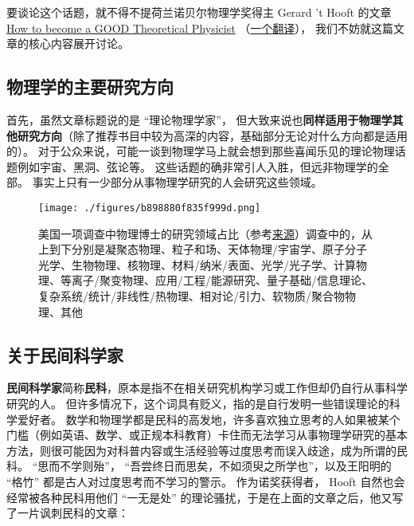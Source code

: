 
\begin{issues}
\issueDraft
\end{issues}

要谈论这个话题，就不得不提荷兰诺贝尔物理学奖得主 Gerard 't Hooft 的文章 \href{https://webspace.science.uu.nl/~hooft101/theorist.html}{How to become a GOOD Theoretical Physicist} （\href{https://xialab.pku.edu.cn/kytdyw1/zdylm.m.jsp?wbtreeid=1011&tstreeid=11956&_t_uid=2945&language=en&homepageuuid=BF649325C5584FC683CE0B601D21AC65&templateuuid=4CC182410BA14FF8B55ED726FB2087FB&producttype=0&_tmode_=99&tsitesapptype=zdylm}{一个翻译}）， 我们不妨就这篇文章的核心内容展开讨论。

\subsection{物理学的主要研究方向}
首先，虽然文章标题说的是 “理论物理学家”， 但大致来说也\textbf{同样适用于物理学其他研究方向}（除了推荐书目中较为高深的内容，基础部分无论对什么方向都是适用的）。 对于公众来说，可能一谈到物理学马上就会想到那些喜闻乐见的理论物理话题例如宇宙、黑洞、弦论等。 这些话题的确非常引人入胜，但远非物理学的全部。 事实上只有一少部分从事物理学研究的人会研究这些领域。

\begin{figure}[ht]
\centering
\texttt{[image: ./figures/b898880f835f999d.png]}
\caption{美国一项调查中物理博士的研究领域占比（参考\href{https://ww2.aip.org/statistics/trends-in-physics-phds}{来源}）调查中的，从上到下分别是凝聚态物理、粒子和场、天体物理/宇宙学、原子分子光学、生物物理、核物理、材料/纳米/表面、光学/光子学、计算物理、等离子/聚变物理、应用/工程/能源研究、量子基础/信息理论、复杂系统/统计/非线性/热物理、相对论/引力、软物质/聚合物物理、其他} \label{fig_SdyPhy_1}
\end{figure}

\subsection{关于民间科学家}
\textbf{民间科学家}简称\textbf{民科}，原本是指不在相关研究机构学习或工作但却仍自行从事科学研究的人。 但许多情况下，这个词具有贬义，指的是自行发明一些错误理论的科学爱好者。 数学和物理学都是民科的高发地，许多喜欢独立思考的人如果被某个门槛（例如英语、数学、或正规本科教育）卡住而无法学习从事物理学研究的基本方法，则很可能因为对科普内容或生活经验等过度思考而误入歧途，成为所谓的民科。 “思而不学则殆”， “吾尝终日而思矣，不如须臾之所学也”，以及王阳明的 “格竹” 都是古人对过度思考而不学习的警示。 作为诺奖获得者， Hooft 自然也会经常被各种民科用他们 “一无是处” 的理论骚扰，于是在上面的文章之后，他又写了一片讽刺民科的文章：

